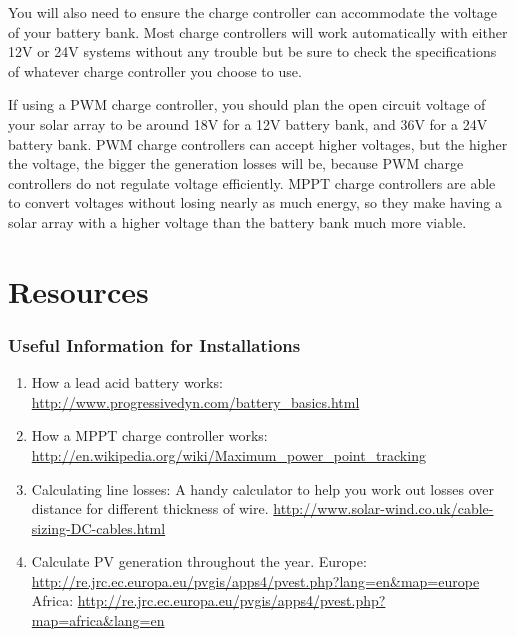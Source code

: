 \documentclass{article}
\theoremstyle{definition}
\theoremstyle{definition}
\theoremstyle{remark}
\begin{document}
  You will also need to ensure the charge controller can accommodate the voltage of your battery bank. Most charge controllers will work automatically with either 12V or 24V systems without any trouble but be sure to check the specifications of whatever charge controller you choose to use.

  If using a PWM charge controller, you should plan the open circuit voltage of your solar array to be around 18V for a 12V battery bank, and 36V for a 24V battery bank. PWM charge controllers can accept higher voltages, but the higher the voltage, the bigger the generation losses will be, because PWM charge controllers do not regulate voltage efficiently. MPPT charge controllers are able to convert voltages without losing nearly as much energy, so they make having a solar array with a higher voltage than the battery bank much more viable.


\section{Resources} %
\label{sec:resources}

  \subsubsection{Useful Information for Installations} %
  \label{ssub:useful_information_for_installations}

    \begin{enumerate}
      \item How a lead acid battery works: \href{http://www.progressivedyn.com/battery\_basics.html}{http://www.progressivedyn.com/battery\_basics.html}
      \item How a MPPT charge controller works: \newline
      \href{http://en.wikipedia.org/wiki/Maximum\_power\_point\_tracking}{http://en.wikipedia.org/wiki/Maximum\_power\_point\_tracking}
      \item Calculating line losses: A handy calculator to help you work out losses over distance for different \newline
      thickness of wire. \href{http://www.solar-wind.co.uk/cable-sizing-DC-cables.html}{http://www.solar-wind.co.uk/cable-sizing-DC-cables.html}
      \item Calculate PV generation throughout the year. \newline
      Europe: \href{http://re.jrc.ec.europa.eu/pvgis/apps4/pvest.php?lang=en\&map=europe}{http://re.jrc.ec.europa.eu/pvgis/apps4/pvest.php?lang=en\&map=europe} \newline
      Africa: \href{http://re.jrc.ec.europa.eu/pvgis/apps4/pvest.php?map=africa\&lang=en}{http://re.jrc.ec.europa.eu/pvgis/apps4/pvest.php?map=africa\&lang=en}
    \end{enumerate}
  
\end{document}
